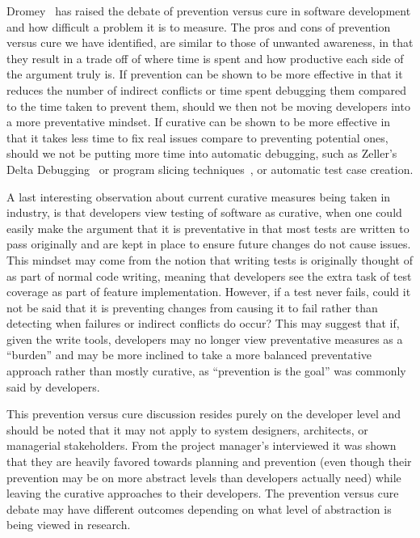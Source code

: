 \documentclass[conference]{IEEEtran}
\begin{document}
Dromey~\cite{Dromey:2003} has raised the debate of prevention versus cure in software development and how difficult a problem it is
to measure. The pros and cons of prevention versus cure we have identified, are similar to those of unwanted awareness,
in that they result in a trade off 
of where time is spent and how productive each side of the argument truly is. If prevention can be shown to be more effective in that
it reduces the number of indirect conflicts or time spent debugging them compared to the time taken to prevent them, should we then
not be moving developers into a more preventative mindset. If curative can be shown to be more effective in that it takes less time
to fix real issues compare to preventing potential ones, should we not be putting more time into automatic debugging, such as
Zeller's Delta Debugging~\cite{Zeller:2002:ICC} or program slicing techniques~\cite{Weiser:1982:PUS}, or automatic test case creation.

A last interesting observation about current curative measures being taken in industry, is that developers view testing of software 
as curative, when one could easily make the argument that it is preventative in that most tests are written to pass originally and
are kept in place to ensure future changes do not cause issues. This mindset may come from the notion that writing tests is originally
thought of as part of normal code writing, meaning that developers see the extra task of test coverage as part of feature implementation.
However, if a test never fails, could it not be said that it is preventing changes from causing it to fail rather than detecting
when failures or indirect conflicts do occur? This may suggest that if, given the write tools, developers may no longer view preventative
measures as a ``burden'' and may be more inclined to take a more balanced preventative approach rather than mostly curative, as
``prevention is the goal'' was commonly said by developers.

This prevention versus cure discussion resides purely on the developer level and should be noted that it may not apply to system
designers, architects, or managerial stakeholders. 
From the project manager's interviewed it was shown that they are heavily favored towards planning and 
prevention (even though their prevention may be on more abstract levels than developers actually need) while leaving the curative
approaches to their developers. The prevention versus cure debate may have different outcomes depending on what level of abstraction
is being viewed in research.
\end{document}
